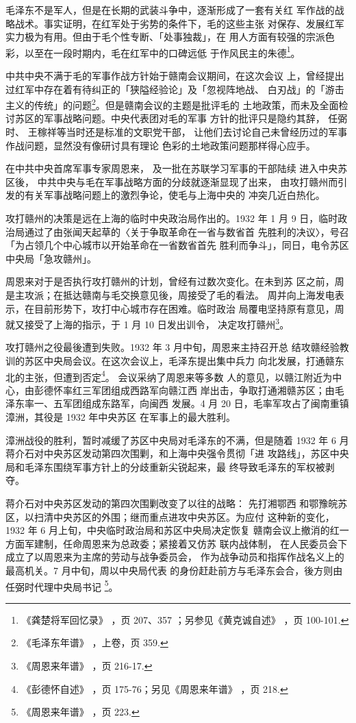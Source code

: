 毛泽东不是军人，但是在长期的武装斗争中，逐渐形成了一套有关红
军作战的战略战术。事实证明，在红军处于劣势的条件下，毛的这些主张
对保存、发展红军实力极为有用。但由于毛个性专断、「处事独裁」，在
用人方面有较强的宗派色彩，以至在一段时期内，毛在红军中的口碑远低
于作风民主的朱德\footnote{《龚楚将军回忆录》
，页 207、357 ；另参见《黄克诚自述》
，页 100-101.}。

中共中央不满于毛的军事作战方针始于赣南会议期间，在这次会议
上，曾经提出过红军中存在着有待纠正的「狭隘经验论」及「忽视阵地战、
白刃战」的「游击主义的传统」的问题\footnote{《毛泽东年谱》
，上卷，页 359.}。但是赣南会议的主题是批评毛的
土地政策，而未及全面检讨苏区的军事战略问题。中央代表团对毛的军事
方针的批评只是隐约其辞，
任弼时、
王稼祥等当时还是标准的文职党干部，
让他们去讨论自己未曾经历过的军事作战问题，显然没有像研讨具有理论
色彩的土地政策问题那样得心应手。

在中共中央首席军事专家周恩来，
及一批在苏联学习军事的干部陆续
进入中央苏区後，
中共中央与毛在军事战略方面的分歧就逐渐显现了出来，
由攻打赣州而引发的有关军事战略问题上的激烈争论，使毛与上海中央的
冲突几近白热化。

攻打赣州的决策是远在上海的临时中央政治局作出的。1932 年 1 月
9 日，临时政治局通过了由张闻天起草的〈关于争取革命在一省与数省首
先胜利的决议〉，号召「为占领几个中心城市以开始革命在一省数省首先
胜利而争斗」，同日，电令苏区中央局「急攻赣州」。

周恩来对于是否执行攻打赣州的计划，曾经有过数次变化。在未到苏
区之前，周是主攻派；在抵达赣南与毛交换意见後，周接受了毛的看法。
周并向上海发电表示，在目前形势下，攻打中心城市存在困难。临时政治
局覆电坚持原有意见，周就又接受了上海的指示，于 1 月 10 日发出训令，
决定攻打赣州\footnote{《周恩来年谱》
，页 216-17.}。

攻打赣州之役最後遭到失败。1932 年 3 月中旬，周恩来主持召开总
结攻赣经验教训的苏区中央局会议。在这次会议上，毛泽东提出集中兵力
向北发展，打通赣东北的主张，但遭到否定\footnote{《彭德怀自述》
，页 175-76；另见《周恩来年谱》
，页 218.}。 会议采纳了周恩来等多数
人的意见，以赣江附近为中心，由彭德怀率红三军团组成西路军向赣江西
岸出击，争取打通湘赣苏区；由毛泽东率一、五军团组成东路军，向闽西
发展。4 月 20 日，毛率军攻占了闽南重镇漳洲，其役是 1932 年中央苏区
在军事上的最大胜利。

漳洲战役的胜利，暂时减缓了苏区中央局对毛泽东的不满，但是随着
1932 年 6 月蒋介石对中央苏区发动第四次围剿，和上海中央强令贯彻「进
攻路线」，苏区中央局和毛泽东围绕军事方针上的分歧重新尖锐起来，最
终导致毛泽东的军权被剥夺。

蒋介石对中央苏区发动的第四次围剿改变了以往的战略：
先打湘鄂西
和鄂豫皖苏区，以扫清中央苏区的外围；继而重点进攻中央苏区。为应付
这种新的变化，1932 年 6 月上旬，中央临时政治局和苏区中央局决定恢复
赣南会议上撤消的红一方面军建制，任命周恩来为总政委；紧接着又仿苏
联内战体制，
在人民委员会下成立了以周恩来为主席的劳动与战争委员会，
作为战争动员和指挥作战名义上的最高机关。7 月中旬，周以中央局代表
的身份赶赴前方与毛泽东会合，後方则由任弼时代理中央局书记
\footnote{《周恩来年谱》
，页 223.}。

